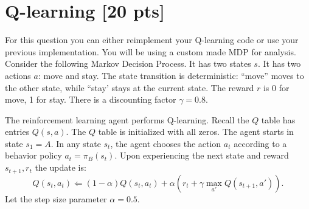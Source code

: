 \documentclass[a4paper]{article}
\theoremstyle{definition}
\begin{document}
\section{Q-learning [20 pts]}
For this question you can either reimplement your Q-learning code or use your previous implementation. You will be using a custom made MDP for analysis. Consider the following Markov Decision Process.
It has two states $s$. It has two actions $a$: move and stay. The state transition is deterministic: ``move'' moves to the other state, while ``stay' stays at the current state. The reward $r$ is 0 for move,  1 for stay. There is a discounting factor $\gamma=0.8$.
\\


The reinforcement learning agent performs Q-learning.  Recall the $Q$ table has entries $Q(s,a)$. The $Q$ table is initialized with all zeros. The agent starts in state $s_1=A$. In any state $s_t$, the agent chooses the action $a_t$ according to a behavior policy $a_t = \pi_B(s_t)$. Upon experiencing the next state and reward $s_{t+1}, r_t$ the update is:
$$Q(s_t, a_t) \Leftarrow (1-\alpha) Q(s_t, a_t) + \alpha \left( r_t + \gamma \max_{a'} Q(s_{t+1}, a') \right).$$
Let the step size parameter $\alpha=0.5$.
\end{document}
